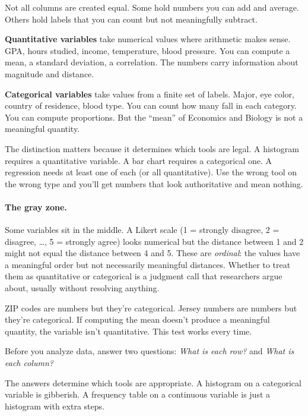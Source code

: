 Not all columns are created equal. Some hold numbers you can add and average. Others hold labels that you can count but not meaningfully subtract.

\textbf{Quantitative variables} take numerical values where arithmetic makes sense. GPA, hours studied, income, temperature, blood pressure. You can compute a mean, a standard deviation, a correlation. The numbers carry information about magnitude and distance.

\textbf{Categorical variables} take values from a finite set of labels. Major, eye color, country of residence, blood type. You can count how many fall in each category. You can compute proportions. But the ``mean'' of Economics and Biology is not a meaningful quantity.

The distinction matters because it determines which tools are legal. A histogram requires a quantitative variable. A bar chart requires a categorical one. A regression needs at least one of each (or all quantitative). Use the wrong tool on the wrong type and you'll get numbers that look authoritative and mean nothing.

\paragraph{The gray zone.} Some variables sit in the middle. A Likert scale (1 = strongly disagree, 2 = disagree, \ldots, 5 = strongly agree) looks numerical but the distance between 1 and 2 might not equal the distance between 4 and 5. These are \emph{ordinal}: the values have a meaningful order but not necessarily meaningful distances. Whether to treat them as quantitative or categorical is a judgment call that researchers argue about, usually without resolving anything.

ZIP codes are numbers but they're categorical. Jersey numbers are numbers but they're categorical. If computing the mean doesn't produce a meaningful quantity, the variable isn't quantitative. This test works every time.

\begin{keyinsight}
Before you analyze data, answer two questions: \emph{What is each row?} and \emph{What is each column?}

The answers determine which tools are appropriate. A histogram on a categorical variable is gibberish. A frequency table on a continuous variable is just a histogram with extra steps.
\end{keyinsight}

